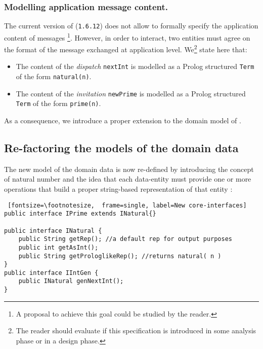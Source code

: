 \documentclass{../llncs}
\begin{document}
\subsubsection{Modelling application message content.\\}
The current version of \contact{} (\texttt{1.6.12}) does not allow to formally specify the application content of messages \footnote{A proposal to achieve this goal could be studied by the reader.}.  However, in order to interact, two entities must agree on the format of the message exchanged at application level.
We\footnote{The reader should evaluate if this specification is introduced in some analysis phase or in a design phase.} state here that:
\begin{itemize}
\item The content of the \textit{dispatch} \texttt{nextInt} is modelled as a Prolog structured \texttt{Term} of the form \texttt{natural(n)}.
\item The content of the \textit{invitation} \texttt{newPrime} is modelled as a Prolog structured \texttt{Term} of the form \texttt{prime(n)}.
\end{itemize}

As a consequence, we introduce a proper extension to the domain model of .

\subsection{Re-factoring the models of the domain data}

The new model of the domain data is now re-defined by introducing the concept of natural number and the idea that each data-entity must provide one or more operations that build a proper string-based representation of that entity :

\begin{Verbatim} [fontsize=\footnotesize,  frame=single, label=New core-interfaces]
public interface IPrime extends INatural{}

public interface INatural {
	public String getRep(); //a default rep for output purposes
 	public int getAsInt();
 	public String getProloglikeRep(); //returns natural( n )
}
public interface IIntGen {
 	public INatural genNextInt(); 	
} 
\end{Verbatim}
\end{document}
